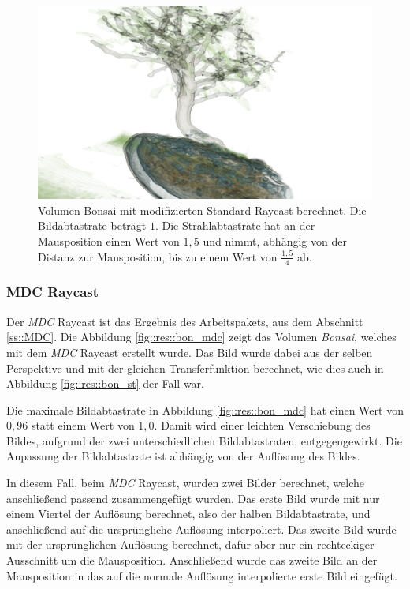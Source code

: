 \begin{landscape}
	\begin{figure}
		\centering
		\includegraphics[width=\textheight]{../../Neue_Messungen/Bonsai/st_ors.png}
		\caption{Volumen Bonsai mit modifizierten Standard Raycast berechnet. Die Bildabtastrate beträgt $1$. Die Strahlabtastrate hat an der Mausposition einen Wert von $1,5$ und nimmt, abhängig von der Distanz zur Mausposition, bis zu einem Wert von $\frac{1,5}{4}$ ab.}
		\label{fig::res::bon_st_ors}
	\end{figure}
\end{landscape}

\subsubsection{MDC Raycast}\label{ss::res::mdc}
Der \emph{MDC} Raycast ist das Ergebnis des Arbeitspakets, aus dem Abschnitt \ref{ss::MDC}.
Die Abbildung \ref{fig::res::bon_mdc} zeigt das Volumen \emph{Bonsai}, welches mit dem \emph{MDC} Raycast erstellt wurde.
Das Bild wurde dabei aus der selben Perspektive und mit der gleichen Transferfunktion berechnet, wie dies auch in Abbildung \ref{fig::res::bon_st} der Fall war.

Die maximale Bildabtastrate in Abbildung \ref{fig::res::bon_mdc} hat einen Wert von $0,96$ statt einem Wert von $1,0$.
Damit wird einer leichten Verschiebung des Bildes, aufgrund der zwei unterschiedlichen Bildabtastraten, entgegengewirkt.
Die Anpassung der Bildabtastrate ist abhängig von der Auflösung des Bildes.

In diesem Fall, beim \emph{MDC} Raycast, wurden zwei Bilder berechnet, welche anschließend passend zusammengefügt wurden.
Das erste Bild wurde mit nur einem Viertel der Auflösung berechnet, also der halben Bildabtastrate, und anschließend auf die ursprüngliche Auflösung interpoliert.
Das zweite Bild wurde mit der ursprünglichen Auflösung berechnet, dafür aber nur ein rechteckiger Ausschnitt um die Mausposition.
Anschließend wurde das zweite Bild an der Mausposition in das auf die normale Auflösung interpolierte erste Bild eingefügt.

